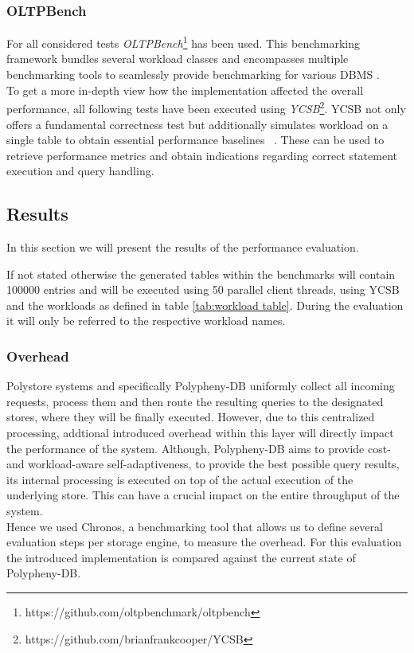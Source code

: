 \subsubsection{OLTPBench}

For all considered tests \textit{OLTPBench}\footnote{https://github.com/oltpbenchmark/oltpbench} 
has been used. This benchmarking framework bundles several workload classes and 
encompasses multiple benchmarking tools to seamlessly provide benchmarking for various DBMS \cite{oltp_2013}.\\
To get a more in-depth view how the implementation affected the overall performance, all following tests have been executed 
using \textit{YCSB}\footnote{https://github.com/brianfrankcooper/YCSB}.
YCSB not only offers a fundamental correctness test but additionally simulates workload on a single table to obtain essential performance baselines ~\cite{ycsb_2010}.
These can be used to retrieve performance metrics and obtain indications regarding correct statement execution and query handling.\\



\subsection{Results}
\label{sec:results}
In this section we will present the results of the performance evaluation.

If not stated otherwise the generated tables within the benchmarks will contain 100000 entries and will be executed using
50 parallel client threads, using YCSB and the workloads as defined in table \ref{tab:workload table}.
During the evaluation it will only be referred to the respective workload names.

           

\subsubsection{Overhead} 
Polystore systems and specifically Polypheny-DB uniformly collect all incoming requests, process them and then
route the resulting queries to the designated stores, where they will be finally executed. 
However, due to this centralized processing, addtional introduced overhead within this layer will directly impact the performance of the system.
Although, Polypheny-DB aims to provide cost- and workload-aware self-adaptiveness, to provide the best possible query results,
its internal processing is executed on top of the actual execution of the underlying store.
This can have a crucial impact on the entire throughput of the system.\\
Hence we used Chronos, a benchmarking tool that allows us to define several evaluation steps per storage engine,
to measure the overhead. For this evaluation the introduced implementation is compared against the current state of Polypheny-DB.\\

